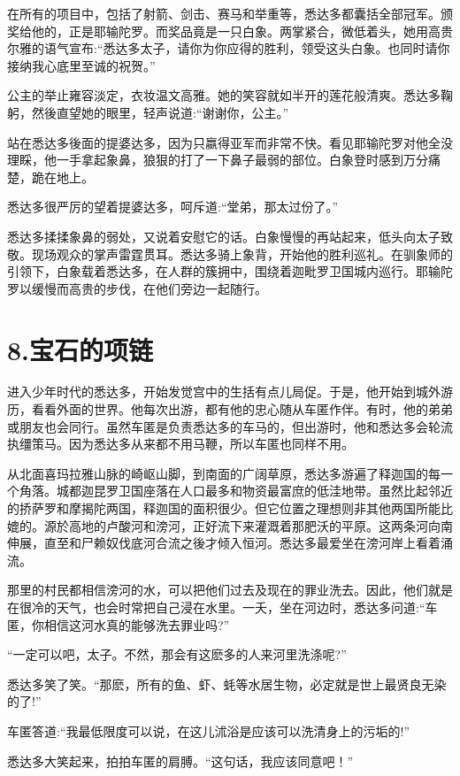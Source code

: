 \documentclass[12pt,twoside,openany]{book}
\begin{document}
在所有的项目中，包括了射箭、剑击、赛马和举重等，悉达多都囊括全部冠军。颁奖给他的，正是耶输陀罗。而奖品竟是一只白象。两掌紧合，微低着头，她用高贵尔雅的语气宣布:“悉达多太子，请你为你应得的胜利，领受这头白象。也同时请你接纳我心底里至诚的祝贺。”

公主的举止雍容淡定，衣妆温文高雅。她的笑容就如半开的莲花般清爽。悉达多鞠躬，然後直望她的眼里，轻声说道:“谢谢你，公主。”

站在悉达多後面的提婆达多，因为只嬴得亚军而非常不快。看见耶输陀罗对他全没理睬，他一手拿起象鼻，狼狠的打了一下鼻子最弱的部位。白象登时感到万分痛楚，跪在地上。

悉达多很严厉的望着提婆达多，呵斥道:“堂弟，那太过份了。”

悉达多揉揉象鼻的弱处，又说着安慰它的话。白象慢慢的再站起来，低头向太子致敬。现场观众的掌声雷霆贯耳。悉达多骑上象背，开始他的胜利巡礼。在驯象师的引领下，白象载着悉达多，在人群的簇拥中，围绕着迦毗罗卫国城内巡行。耶输陀罗以缓慢而高贵的步伐，在他们旁边一起随行。

\chapter{8.宝石的项链}\label{ch8}

进入少年时代的悉达多，开始发觉宫中的生括有点儿局促。于是，他开始到城外游历，看看外面的世界。他每次出游，都有他的忠心随从车匿作伴。有时，他的弟弟或朋友也会同行。虽然车匿是负责悉达多的车马的，但出游时，他和悉达多会轮流执缰策马。因为悉达多从来都不用马鞭，所以车匿也同样不用。

从北面喜玛拉雅山脉的崎岖山脚，到南面的广阔草原，悉达多游遍了释迦国的每一个角落。城都迦昆罗卫国座落在人口最多和物资最富庶的低洼地带。虽然比起邻近的挢萨罗和摩揭陀两国，释迦国的面积很少。但它位置之理想则非其他两国所能比媲的。源於高地的卢酸河和滂河，正好流下来灌溉着那肥沃的平原。这两条河向南伸展，直至和尸赖奴伐底河合流之後才倾入恒河。悉达多最爱坐在滂河岸上看着涌流。

那里的村民都相信滂河的水，可以把他们过去及现在的罪业洗去。因此，他们就是在很冷的天气，也会时常把自己浸在水里。一夭，坐在河边时，悉达多问道:“车匿，你相信这河水真的能够洗去罪业吗?”

“一定可以吧，太子。不然，那会有这麽多的人来河里洗涤呢?”

悉达多笑了笑。“那麽，所有的鱼、虾、蚝等水居生物，必定就是世上最贤良无染的了!”

车匿答道:“我最低限度可以说，在这儿沭浴是应该可以洗清身上的污垢的!”

悉达多大笑起来，拍拍车匿的肩膊。“这句话，我应该同意吧！”
\end{document}
